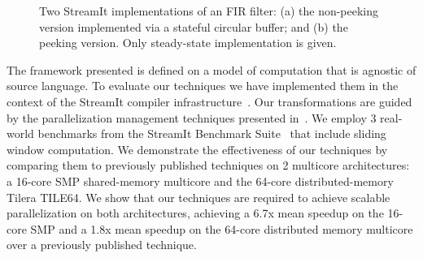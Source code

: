 \begin{figure}[t]
\caption[Two implementations of an FIR filter.]{\label{fig:fir-code}
  Two StreamIt implementations of an FIR filter:
   (a) the non-peeking version implemented via a
  stateful circular buffer; and (b) the peeking version. Only steady-state implementation is
  given.}
\end{figure}

The framework presented is defined on a model of computation that is
agnostic of source language.  To evaluate our techniques we have
implemented them in the context of the StreamIt compiler
infrastructure~\cite{gordon-asplos06}.  Our transformations are guided
by the parallelization management techniques presented
in~\cite{gordon-asplos06}.  We employ 3 real-world benchmarks from the
StreamIt Benchmark Suite~\cite{streamit-suite} that include sliding
window computation.  We demonstrate the effectiveness of our
techniques by comparing them to previously published techniques on 2
multicore architectures: a 16-core SMP shared-memory multicore and the
64-core distributed-memory Tilera TILE64.  We show that
our techniques are required to achieve scalable parallelization on
both architectures, achieving a 6.7x mean speedup on the 16-core SMP
and a 1.8x mean speedup on the 64-core distributed memory multicore
over a previously published technique.

